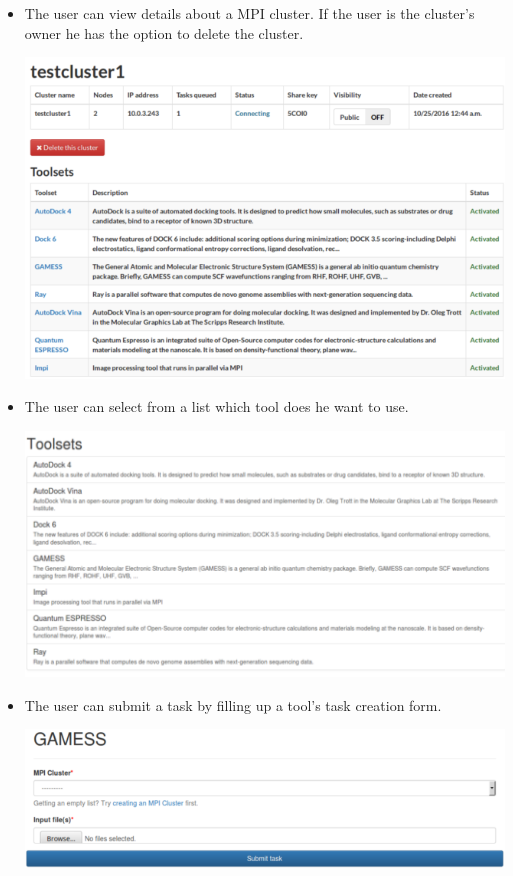 \documentclass[journal]{./IEEE/IEEEtran}
\begin{document}
\begin{itemize}
		\item The user can view details about a MPI cluster. If the user is the cluster's owner he has the option to delete the cluster. \newline
		\begin{center}			
			\includegraphics[scale=0.40]{./images/mpi_detail_view_2.png}			
		\end{center}	
		
		\item The user can select from a list which tool does he want to use. 	
		\begin{center}			
			\includegraphics[scale=0.45]{./images/toolset_list_2.png}			
		\end{center}
		
		\item The user can submit a task by filling up a tool's task creation form. \newline
		\begin{center}			
			\includegraphics[scale=0.40]{./images/gamess_form_2.png}			
		\end{center}	
		

\end{itemize}
\end{document}
